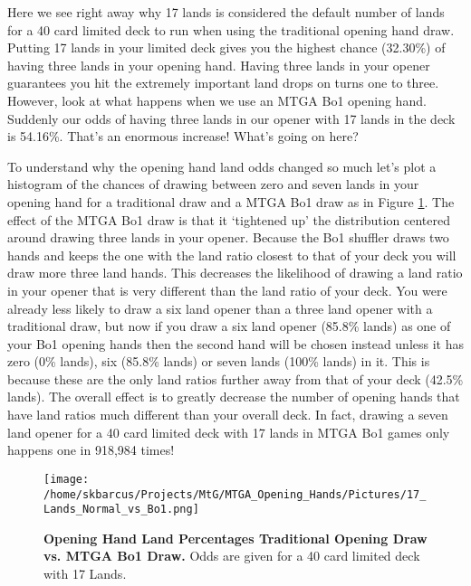 \documentclass[oneside]{book}   %
\begin{document}
Here we see right away why 17 lands is considered the default number of lands for a 40 card limited deck to run when using the traditional opening hand draw. Putting 17 lands in your limited deck gives you the highest chance (32.30\%) of having three lands in your opening hand. Having three lands in your opener guarantees you hit the extremely important land drops on turns one to three. However, look at what happens when we use an MTGA Bo1 opening hand. Suddenly our odds of having three lands in our opener with 17 lands in the deck is 54.16\%. That's an enormous increase! What's going on here?

To understand why the opening hand land odds changed so much let's plot a histogram of the chances of drawing between zero and seven lands in your opening hand for a traditional draw and a MTGA Bo1 draw as in Figure \ref{fig:traditional_vs_bo1_17}. The effect of the MTGA Bo1 draw is that it `tightened up' the distribution centered around drawing three lands in your opener. Because the Bo1 shuffler draws two hands and keeps the one with the land ratio closest to that of your deck you will draw more three land hands. This decreases the likelihood of drawing a land ratio in your opener that is very different than the land ratio of your deck. You were already less likely to draw a six land opener than a three land opener with a traditional draw, but now if you draw a six land opener (85.8\% lands) as one of your Bo1 opening hands then the second hand will be chosen instead unless it has zero (0\% lands), six (85.8\% lands) or seven lands (100\% lands) in it. This is because these are the only land ratios further away from that of your deck (42.5\% lands). The overall effect is to greatly decrease the number of opening hands that have land ratios much different than your overall deck. In fact, drawing a seven land opener for a 40 card limited deck with 17 lands in MTGA Bo1 games only happens one in 918,984 times!

 	\begin{figure}[!ht]
	\centering
	\centerline{\texttt{[image: /home/skbarcus/Projects/MtG/MTGA\_Opening\_Hands/Pictures/17\_Lands\_Normal\_vs\_Bo1.png]}}
	\caption{
	{\bf{Opening Hand Land Percentages Traditional Opening Draw vs. MTGA Bo1 Draw.}} Odds are given for a 40 card limited deck with 17 Lands.}
	\label{fig:traditional_vs_bo1_17}
	\end{figure}	
	
\end{document}
